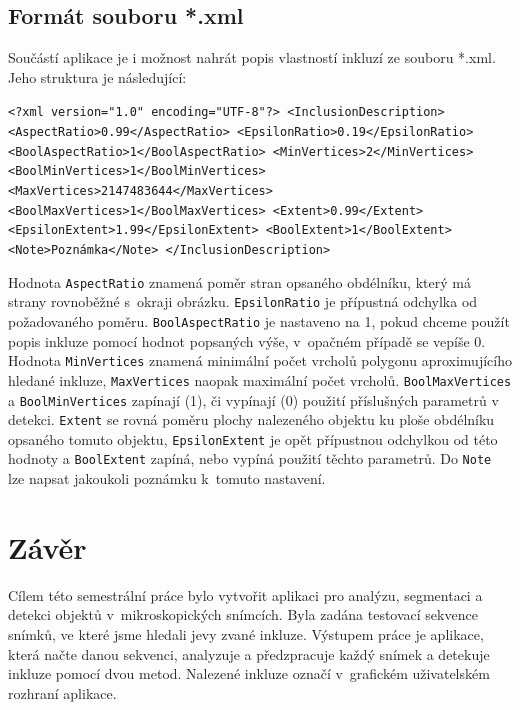 \documentclass[12pt, a4paper]{report}
\begin{document}
	\section{Formát souboru *.xml}
	Součástí aplikace je i možnost nahrát popis vlastností inkluzí ze souboru *.xml. Jeho struktura je následující:
	
	\texttt{<?xml version="1.0" encoding="UTF-8"?>
<InclusionDescription>
    <AspectRatio>0.99</AspectRatio>
    <EpsilonRatio>0.19</EpsilonRatio>
    <BoolAspectRatio>1</BoolAspectRatio>
    <MinVertices>2</MinVertices>
    <BoolMinVertices>1</BoolMinVertices>
    <MaxVertices>2147483644</MaxVertices>
    <BoolMaxVertices>1</BoolMaxVertices>
    <Extent>0.99</Extent>
    <EpsilonExtent>1.99</EpsilonExtent>
    <BoolExtent>1</BoolExtent>
    <Note>Poznámka</Note>
</InclusionDescription>}

	Hodnota \texttt{AspectRatio} znamená poměr stran opsaného obdélníku, který má strany rovnoběžné s~okraji obrázku. \texttt{EpsilonRatio} je přípustná odchylka od požadovaného poměru. \texttt{BoolAspectRatio} je nastaveno na 1, pokud chceme použít popis inkluze pomocí hodnot popsaných výše, v~opačném případě se vepíše 0. Hodnota \texttt{MinVertices} znamená minimální počet vrcholů polygonu aproximujícího hledané inkluze, \texttt{MaxVertices} naopak maximální počet vrcholů. \texttt{BoolMaxVertices} a \texttt{BoolMinVertices} zapínají (1), či vypínají (0) použití příslušných parametrů v detekci. \texttt{Extent} se rovná poměru plochy nalezeného objektu ku ploše obdélníku opsaného tomuto objektu, \texttt{EpsilonExtent} je opět přípustnou odchylkou od této hodnoty a \texttt{BoolExtent} zapíná, nebo vypíná použití těchto parametrů. Do \texttt{Note} lze napsat jakoukoli poznámku k~tomuto nastavení.

\chapter{Závěr}
Cílem této semestrální práce bylo vytvořit aplikaci pro analýzu, segmentaci a detekci objektů v~mikroskopických snímcích. Byla zadána testovací sekvence snímků, ve které jsme hledali jevy zvané inkluze. Výstupem práce je aplikace, která načte danou sekvenci, analyzuje a předzpracuje každý snímek a detekuje inkluze pomocí dvou metod. Nalezené inkluze označí v~grafickém uživatelském rozhraní aplikace.
\end{document}
